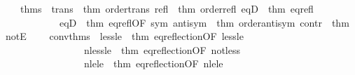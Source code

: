 \begin{isabellebody}
\ \ \ \ thms\ {\isacharequal}{\kern0pt}\ {\isacharbraceleft}{\kern0pt}trans\ {\isacharequal}{\kern0pt}\ {\isacharat}{\kern0pt}{\isacharbraceleft}{\kern0pt}thm\ order{\isacharunderscore}{\kern0pt}trans{\isacharbraceright}{\kern0pt}{\isacharcomma}{\kern0pt}\ refl\ {\isacharequal}{\kern0pt}\ {\isacharat}{\kern0pt}{\isacharbraceleft}{\kern0pt}thm\ order{\isacharunderscore}{\kern0pt}refl{\isacharbraceright}{\kern0pt}{\isacharcomma}{\kern0pt}\ eqD{}\ {\isacharequal}{\kern0pt}\ {\isacharat}{\kern0pt}{\isacharbraceleft}{\kern0pt}thm\ eq{\isacharunderscore}{\kern0pt}refl{\isacharbraceright}{\kern0pt}{\isacharcomma}{\kern0pt}\isanewline
\ \ \ \ \ \ \ \ \ \ \ \ eqD{}\ {\isacharequal}{\kern0pt}\ {\isacharat}{\kern0pt}{\isacharbraceleft}{\kern0pt}thm\ eq{\isacharunderscore}{\kern0pt}refl{\isacharbrackleft}{\kern0pt}OF\ sym{\isacharbrackright}{\kern0pt}{\isacharbraceright}{\kern0pt}{\isacharcomma}{\kern0pt}\ antisym\ {\isacharequal}{\kern0pt}\ {\isacharat}{\kern0pt}{\isacharbraceleft}{\kern0pt}thm\ order{\isacharunderscore}{\kern0pt}antisym{\isacharbraceright}{\kern0pt}{\isacharcomma}{\kern0pt}\ contr\ {\isacharequal}{\kern0pt}\ {\isacharat}{\kern0pt}{\isacharbraceleft}{\kern0pt}thm\ notE{\isacharbraceright}{\kern0pt}{\isacharbraceright}{\kern0pt}{\isacharcomma}{\kern0pt}\isanewline
\ \ \ \ conv{\isacharunderscore}{\kern0pt}thms\ {\isacharequal}{\kern0pt}\ {\isacharbraceleft}{\kern0pt}less{\isacharunderscore}{\kern0pt}le\ {\isacharequal}{\kern0pt}\ {\isacharat}{\kern0pt}{\isacharbraceleft}{\kern0pt}thm\ eq{\isacharunderscore}{\kern0pt}reflection{\isacharbrackleft}{\kern0pt}OF\ less{\isacharunderscore}{\kern0pt}le{\isacharbrackright}{\kern0pt}{\isacharbraceright}{\kern0pt}{\isacharcomma}{\kern0pt}\isanewline
\ \ \ \ \ \ \ \ \ \ \ \ \ \ \ \ \ nless{\isacharunderscore}{\kern0pt}le\ {\isacharequal}{\kern0pt}\ {\isacharat}{\kern0pt}{\isacharbraceleft}{\kern0pt}thm\ eq{\isacharunderscore}{\kern0pt}reflection{\isacharbrackleft}{\kern0pt}OF\ not{\isacharunderscore}{\kern0pt}less{\isacharbrackright}{\kern0pt}{\isacharbraceright}{\kern0pt}{\isacharcomma}{\kern0pt}\isanewline
\ \ \ \ \ \ \ \ \ \ \ \ \ \ \ \ \ nle{\isacharunderscore}{\kern0pt}le\ {\isacharequal}{\kern0pt}\ {\isacharat}{\kern0pt}{\isacharbraceleft}{\kern0pt}thm\ eq{\isacharunderscore}{\kern0pt}reflection{\isacharbrackleft}{\kern0pt}OF\ nle{\isacharunderscore}{\kern0pt}le{\isacharbrackright}{\kern0pt}{\isacharbraceright}{\kern0pt}{\isacharbraceright}{\kern0pt}\isanewline
\ \ {\isacharbraceright}{\kern0pt}\isanewline
{\isacartoucheclose}%
\endisatagML
{\isafoldML}%
%
\isadelimML
\isanewline
%

\end{isabellebody}
